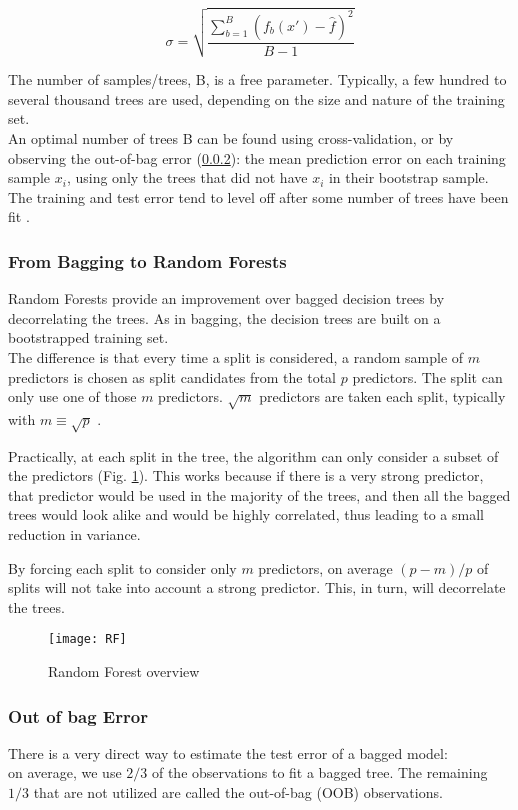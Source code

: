 \begin{equation}
	{\sigma ={\sqrt {\frac {\sum_{b=1}^{B}(f_{b}(x')-{\hat {f}})^{2}}{B-1}}}}
\end{equation}

The number of samples/trees, B, is a free parameter. Typically, a few hundred to several thousand trees are used, depending on the size and nature of the training set. \\
An optimal number of trees B can be found using cross-validation, or by observing the out-of-bag error (\ref{oob}): the mean prediction error on each training sample $x_i$, using only the trees that did not have $x_i$ in their bootstrap sample. \\
The training and test error tend to level off after some number of trees have been fit \cite{ISLR}.

\subsubsection{From Bagging to Random Forests}
Random Forests provide an improvement over bagged decision trees by decorrelating the trees. As in bagging, the decision trees are built on a bootstrapped training set. \\
The difference is that every time a split is considered, a random sample of $m$ predictors is chosen as split candidates from the total $p$ predictors. The split can only use one of those $m$ predictors. $\sqrt{m}$ predictors are taken each split, typically with $m \equiv \sqrt{p}$ \cite{ISLR}.

Practically, at each split in the tree, the algorithm can only consider a subset of the predictors (Fig. \ref{fig:RF}). This works because if there is a very strong predictor, that predictor would be used in the majority of the trees, and then all the bagged trees would look alike and would be highly correlated, thus leading to a small reduction in variance.

By forcing each split to consider only $m$ predictors, on average $(p - m)/p$ of splits will not take into account a strong predictor. This, in turn, will decorrelate the trees.

\begin{figure}[H]
	\centering
	\texttt{[image: RF]}
	\caption{Random Forest overview}
	\label{fig:RF}
\end{figure}

\subsubsection{Out of bag Error} \label{oob}
There is a very direct way to estimate the test error of a bagged model: \\
on average, we use $2/3$ of the observations to fit a bagged tree. The remaining $1/3$ that are not utilized are called the out-of-bag (OOB) observations. 

